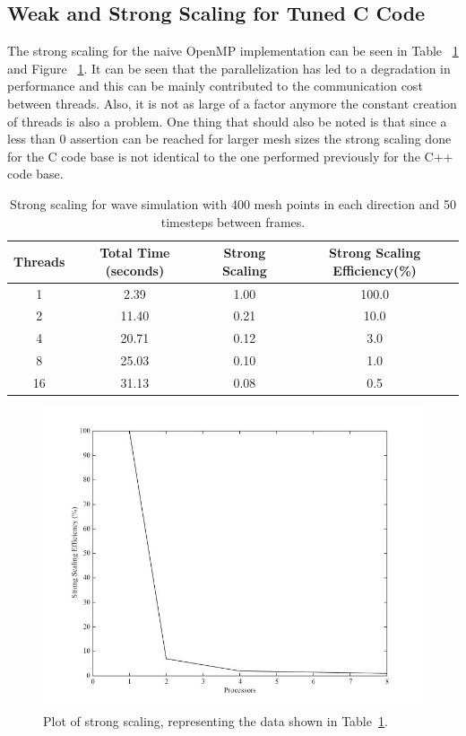 \documentclass[12pt]{article}
\begin{document}
\subsection{Weak and Strong Scaling for Tuned C Code}

The strong scaling for the naive OpenMP implementation can be seen in Table ~\ref{sscale_c} and Figure ~\ref{ssplot_c}. It can be seen that the parallelization has led to a degradation in performance and this can be mainly contributed to the communication cost between threads. Also, it is not as large of a factor anymore the constant creation of threads is also a problem. One thing that should also be noted is that since a less than 0 assertion can be reached for larger mesh sizes the strong scaling done for the C code base is not identical to the one performed previously for the C++ code base.

\begin{table}[h]
	\begin{center}
		\begin{tabular}{|c c c c|}
			\hline
			Threads & Total Time (seconds) & Strong Scaling & Strong Scaling Efficiency(\%) \\ \hline
			1 & 2.39 & 1.00  & 100.0 \\ \hline
			2 & 11.40 & 0.21 &  10.0 \\ \hline
			4 & 20.71 &  0.12&  3.0  \\ \hline
			8 & 25.03 &  0.10&  1.0  \\ \hline
			16 & 31.13 &  0.08& 0.5   \\ \hline
		\end{tabular}
		\caption{Strong scaling for wave simulation with 400 mesh points in each direction and 50 timesteps between frames.}
		\label{sscale_c}
	\end{center}
\end{table}

		\begin{figure}[h]
			\begin{center}
				\includegraphics[width=0.5\columnwidth]{sscale_plot}
				\caption{Plot of strong scaling, representing the data shown in Table~\ref{sscale_c}.}
				\label{ssplot_c}
			\end{center}
		\end{figure}
\end{document}
